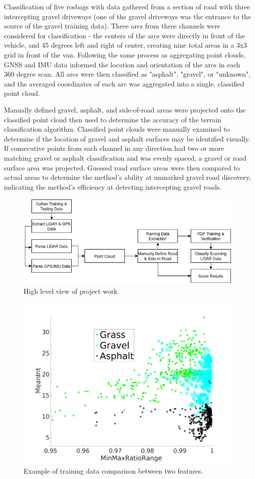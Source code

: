 \documentclass[numbered,pdftex]{ohio-etd}
\begin{document}
{		{Classification of five rosbags with data gathered from a section of road with three intercepting gravel driveways (one of the gravel driveways was the entrance to the source of the gravel training data). Three arcs from three channels were considered for classification - the centers of the arcs were directly in front of the vehicle, and 45 degrees left and right of center, creating nine total areas in a 3x3 grid in front of the van. Following the same process as aggregating point clouds, GNSS and IMU data informed the location and orientation of the arcs in each 360 degree scan. All arcs were then classified as "asphalt", "gravel", or "unknown", and the averaged coordinates of each arc was aggregated into a single, classified point cloud.}
		
		{Manually defined gravel, asphalt, and side-of-road areas were projected onto the classified point cloud then used to determine the accuracy of the terrain classification algorithm. Classified point clouds were manually examined to determine if the location of gravel and asphalt surfaces may be identified visually. If consecutive points from each channel in any direction had two or more matching gravel or asphalt classification and was evenly spaced, a gravel or road surface area was projected. Guessed road surface areas were then compared to actual areas to determine the method's ability at unmarked gravel road discovery, indicating the method's efficiency at detecting intercepting gravel roads.}
		
		\begin{figure}
			\centering
			\includegraphics[width=0.7\linewidth]{Defense_Images/flowz_2}
			\caption[Project Flow]{High level view of project work}
			\label{fig:flowz_2}
		\end{figure}
		
		\begin{figure}
			\centering
			\includegraphics[width=0.7\linewidth]{Defense_Images/training_data_cluster}
			\caption[Example Clustering]{Example of training data comparison between two features.}
			\label{fig:training_data_cluster}
		\end{figure}
		
}
\end{document}

